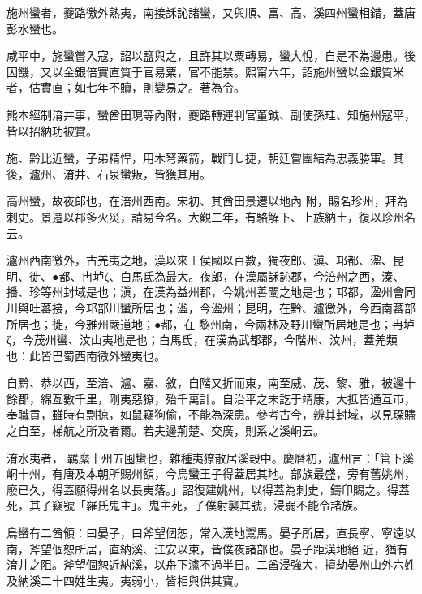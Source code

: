 \begin{pinyinscope}
 施州蠻者，夔路徼外熟夷，南接訸訫諸蠻，又與順、富、高、溪四州蠻相錯，蓋唐彭水蠻也。



 咸平中，施蠻嘗入寇，詔以鹽與之，且許其以粟轉易，蠻大悅，自是不為邊患。後
 因饑，又以金銀倍實直質于官易粟，官不能禁。熙甯六年，詔施州蠻以金銀質米者，估實直；如七年不贖，則變易之。著為令。



 熊本經制淯井事，蠻酋田現等內附，夔路轉運判官董鉞、副使孫珪、知施州寇平，皆以招納功被賞。



 施、黔比近蠻，子弟精悍，用木弩藥箭，戰鬥し捷，朝廷嘗團結為忠義勝軍。其後，瀘州、淯井、石泉蠻叛，皆獲其用。



 高州蠻，故夜郎也，在涪州西南。宋初、其酋田景遷以地內
 附，賜名珍州，拜為刺史。景遷以郡多火災，請易今名。大觀二年，有駱解下、上族納土，復以珍州名云。



 瀘州西南徼外，古羌夷之地，漢以來王侯國以百數，獨夜郎、滇、邛都、溋、昆明、徙、●都、冉垆ζ、白馬氐為最大。夜郎，在漢屬訸訫郡，今涪州之西，溱、播、珍等州封域是也；滇，在漢為益州郡，今姚州善闡之地是也；邛都，溋州會同川與吐蕃接，今邛部川蠻所居也；溋，今溋州；昆明，在黔、瀘徼外，今西南蕃部所居也；徙，今雅州嚴道地；●都，在
 黎州南，今兩林及野川蠻所居地是也；冉垆ζ，今茂州蠻、汶山夷地是也；白馬氐，在漢為武都郡，今階州、汶州，蓋羌類也：此皆巴蜀西南徼外蠻夷也。



 自黔、恭以西，至涪、瀘、嘉、敘，自階又折而東，南至威、茂、黎、雅，被邊十餘郡，綿亙數千里，剛夷惡獠，殆千萬計。自治平之末訖于靖康，大抵皆通互市，奉職貢，雖時有剽掠，如鼠竊狗偷，不能為深患。參考古今，辨其封域，以見琛贐之自至，梯航之所及者爾。若夫邊荊楚、交廣，則系之溪峒云。



 淯水夷者，
 羈縻十州五囤蠻也，雜種夷獠散居溪穀中。慶曆初，瀘州言：「管下溪峒十州，有唐及本朝所賜州額，今烏蠻王子得蓋居其地。部族最盛，旁有舊姚州，廢已久，得蓋願得州名以長夷落。」詔復建姚州，以得蓋為刺史，鑄印賜之。得蓋死，其子竊號「羅氏鬼主」。鬼主死，子僕射襲其號，浸弱不能令諸族。



 烏蠻有二酋領：曰晏子，曰斧望個恕，常入漢地鬻馬。晏子所居，直長寧、寧遠以南，斧望個恕所居，直納溪、江安以東，皆僕夜諸部也。晏子距漢地絕
 近，猶有淯井之阻。斧望個恕近納溪，以舟下瀘不過半日。二酋浸強大，擅劫晏州山外六姓及納溪二十四姓生夷。夷弱小，皆相與供其寶。




\end{pinyinscope}
